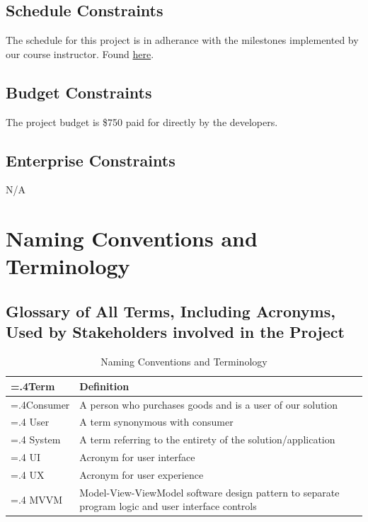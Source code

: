\documentclass[12pt]{article}
\begin{document}
\subsection{Schedule Constraints}
The schedule for this project is in adherance with the milestones implemented by our course instructor. Found \href{https://gitlab.cas.mcmaster.ca/courses/capstone/-/blob/main/CourseOutline/Capstone_Outline.pdf}{here}.
\subsection{Budget Constraints}
The project budget is \$750 paid for directly by the developers.
\subsection{Enterprise Constraints}
N/A
\section{Naming Conventions and Terminology}
\subsection{Glossary of All Terms, Including Acronyms, Used by Stakeholders
involved in the Project}
\begin{table}[htbp]
    \centering
    \begin{tabularx}{\textwidth}{|>{\hsize=.4\hsize}X|>{\hsize=1.6\hsize}X|}
        \hline
        \textbf{Term} & \textbf{Definition}\\
        \hline
        Consumer & A person who purchases goods and is a user of our solution \\
        \hline
        User & A term synonymous with consumer \\
        \hline
        System & A term referring to the entirety of the solution/application \\
        \hline
        UI & Acronym for user interface \\
        \hline
        UX & Acronym for user experience \\
        \hline
        MVVM & Model-View-ViewModel software design pattern to separate program logic and user interface controls \\
        \hline
    \end{tabularx}
    \caption{Naming Conventions and Terminology}
    \label{tab:namingconventionsandterminology}
\end{table}
\end{document}
